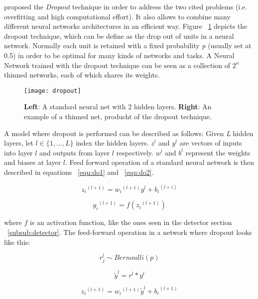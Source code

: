 \textcite{srivastava2014dropout} proposed the \textit{Dropout} technique in order to address the two cited problems (i.e. overfitting and high computational effort). It also allows to combine many different neural networks architectures in an efficient way. Figure ~\ref{fig:dropout} depicts the dropout technique, which can be define as the drop out  of units in a neural network.  Normally each unit is retained with a fixed probability \textit{p} (usually set at 0.5) in order to be optimal for many kinds of networks and tasks. A Neural Network trained with the dropout technique can be seen as a collection of $2^n$ thinned networks, each of which shares its weights. 

\begin{figure}
 \centering
 \texttt{[image: dropout]}
 \caption{\textbf{Left}: A standard neural net with 2 hidden layers. \textbf{Right}: An example of a thinned net, producht of the dropout technique.}
 \label{fig:dropout}
\end{figure}

A model where dropout is performed can be described as follows: Given \textit{L} hidden layers, let $l\in\{1,...,L\}$ index the hidden layers. $z^l$ and $y^l$ are vectors of inputs into layer $l$ and outputs from layer $l$ respectively. $w^l$ and $b^l$ represent the weights and biases at layer $l$. Feed forward operation of a standard neural network is then described in equations ~\ref{equ:do1} and ~\ref{equ:do2}.
  
\begin{equation}
 {z_i}^{(l+1)} = {w_i}^{(l+1)}y^l+{b_i}^{(l+i)}
 \label{equ:do1}
\end{equation}

\begin{equation}
 {y_i}^{(l+1)} = f({z_i}^{(l+1)})
 \label{equ:do2}
\end{equation}

where $f$ is an activation function, like the ones seen in the detector section ~\ref{subsub:detector}. The feed-forward operation in a network where dropout looks like this:  

\begin{equation}
 {r^l_j} \sim Bernoulli(p)
 \label{equ:do3}
\end{equation}

\begin{equation}
 \tilde{y}^l = r^l \ast y^l
 \label{equ:do4}
\end{equation}

\begin{equation}
 {z_i}^{(l+1)} = {w_i}^{(l+1)}\tilde{y}^l+{b_i}^{(l+1)}
 \label{equ:do5}
\end{equation}

